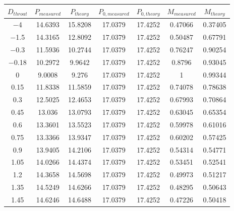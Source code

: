 \begin{tabular}{ccccccc}
\toprule
$D_{throat}$ & $P_{measured}$ & $P_{theory}$ & $P_{0,measured}$ & $P_{0,theory}$ & $M_{measured}$ & $M_{theory}$ \\
\midrule
\num{-4} & \num{14.6393} & \num{15.8208} & \num{17.0379} & \num{17.4252} & \num{0.47066} & \num{0.37405} \\ 
\num{-1.5} & \num{14.3165} & \num{12.8092} & \num{17.0379} & \num{17.4252} & \num{0.50487} & \num{0.67791} \\ 
\num{-0.3} & \num{11.5936} & \num{10.2744} & \num{17.0379} & \num{17.4252} & \num{0.76247} & \num{0.90254} \\ 
\num{-0.18} & \num{10.2972} & \num{9.9642} & \num{17.0379} & \num{17.4252} & \num{0.8796} & \num{0.93045} \\ 
\num{0} & \num{9.0008} & \num{9.276} & \num{17.0379} & \num{17.4252} & \num{1} & \num{0.99344} \\ 
\num{0.15} & \num{11.8338} & \num{11.5859} & \num{17.0379} & \num{17.4252} & \num{0.74078} & \num{0.78638} \\ 
\num{0.3} & \num{12.5025} & \num{12.4653} & \num{17.0379} & \num{17.4252} & \num{0.67993} & \num{0.70864} \\ 
\num{0.45} & \num{13.036} & \num{13.0793} & \num{17.0379} & \num{17.4252} & \num{0.63045} & \num{0.65354} \\ 
\num{0.6} & \num{13.3601} & \num{13.5523} & \num{17.0379} & \num{17.4252} & \num{0.59978} & \num{0.61016} \\ 
\num{0.75} & \num{13.3366} & \num{13.9347} & \num{17.0379} & \num{17.4252} & \num{0.60202} & \num{0.57425} \\ 
\num{0.9} & \num{13.9405} & \num{14.2106} & \num{17.0379} & \num{17.4252} & \num{0.54314} & \num{0.54771} \\ 
\num{1.05} & \num{14.0266} & \num{14.4374} & \num{17.0379} & \num{17.4252} & \num{0.53451} & \num{0.52541} \\ 
\num{1.2} & \num{14.3658} & \num{14.5698} & \num{17.0379} & \num{17.4252} & \num{0.49973} & \num{0.51217} \\ 
\num{1.35} & \num{14.5249} & \num{14.6266} & \num{17.0379} & \num{17.4252} & \num{0.48295} & \num{0.50643} \\ 
\num{1.45} & \num{14.6246} & \num{14.6488} & \num{17.0379} & \num{17.4252} & \num{0.47226} & \num{0.50418} \\ 
\bottomrule
\end{tabular}